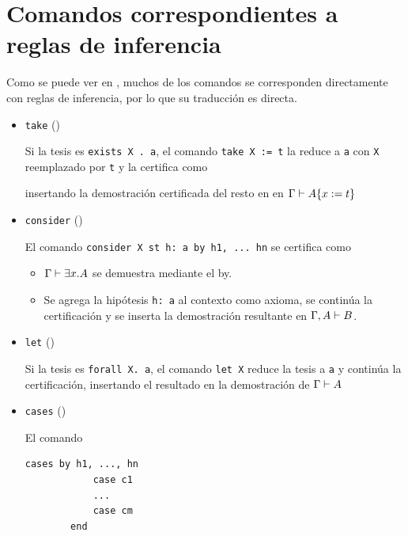 \section{Comandos correspondientes a reglas de inferencia}

Como se puede ver en , muchos de los comandos se corresponden directamente con reglas de inferencia,
por lo que su traducción es directa.

\begin{itemize}
    \item \lstinline{take} ()

    Si la tesis es \lstinline{exists X . a}, el comando \lstinline{take X := t}
    la reduce a \lstinline{a} con \lstinline{X} reemplazado por \lstinline{t} y la certifica como
    
    \proofTreeExistsI

    insertando la demostración certificada del resto en en $\Gamma \vdash A \{x := t\}$

    \item \lstinline{consider} ()
    
    El comando \lstinline{consider X st h: a by h1, ... hn} se certifica como
    
    \proofTreeExistsE

    \begin{itemize}
        \item $\Gamma \vdash \exists x . A$ se demuestra mediante el by.
        \item Se agrega la hipótesis \lstinline{h: a} al contexto como axioma, se continúa la certificación y se inserta la demostración resultante en $\Gamma, A \vdash B$.
    \end{itemize}

    \item \lstinline{let} ()
    
    Si la tesis es \lstinline{forall X. a}, el comando \lstinline{let X} reduce la tesis a \lstinline{a} y continúa la certificación, insertando el resultado en la demostración de $\Gamma \vdash A$

    \proofTreeForallI

    \item \lstinline{cases} ()
    
    El comando
    \begin{lstlisting}[numbers=none]
        cases by h1, ..., hn
            case c1
            ...
            case cm
        end
    \end{lstlisting}


\end{itemize}
